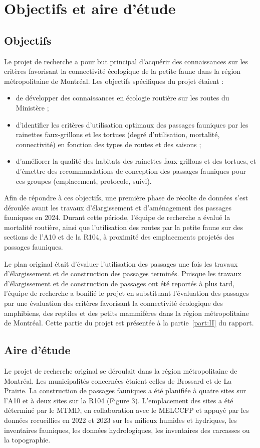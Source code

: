 
\section{Objectifs et aire d'étude}

\subsection{Objectifs}

Le projet de recherche a pour but principal d'acquérir des connaissances sur les critères favorisant la connectivité écologique de la petite faune dans la région métropolitaine de Montréal. Les objectifs spécifiques du projet étaient :

\begin{itemize}
    \item de développer des connaissances en écologie routière sur les routes du Ministère ;
    \item d'identifier les critères d'utilisation optimaux des passages fauniques par les rainettes faux-grillons et les tortues (degré d'utilisation, mortalité, connectivité) en fonction des types de routes et des saisons ;
    \item d'améliorer la qualité des habitats des rainettes faux-grillons et des tortues, et d'émettre des recommandations de conception des passages fauniques pour ces groupes (emplacement, protocole, suivi).
\end{itemize}

Afin de répondre à ces objectifs, une première phase de récolte de données s'est déroulée avant les travaux d'élargissement et d'aménagement des passages fauniques en 2024. Durant cette période, l'équipe de recherche a évalué la mortalité routière, ainsi que l'utilisation des routes par la petite faune sur des sections de l'A10 et de la R104, à proximité des emplacements projetés des passages fauniques.

Le plan original était d’évaluer l’utilisation des passages une fois les travaux d’élargissement et de construction des passages terminés. Puisque les travaux d’élargissement et de construction de passages ont été reportés à plus tard, l’équipe de recherche a bonifié le projet en substituant l’évaluation des passages par une évaluation des critères favorisant la connectivité écologique des amphibiens, des reptiles et des petits mammifères dans la région métropolitaine de Montréal. Cette partie du projet est présentée à la partie~\ref{part:II} du rapport.

\subsection{Aire d'étude}

Le projet de recherche original se déroulait dans la région métropolitaine de Montréal. Les municipalités concernées étaient celles de Brossard et de La Prairie. La construction de passages fauniques a été planifiée à quatre sites sur l'A10 et à deux sites sur la R104 (Figure 3). L’emplacement des sites a été déterminé par le MTMD, en collaboration avec le MELCCFP et appuyé par les données recueillies en 2022 et 2023 sur les milieux humides et hydriques, les inventaires fauniques, les données hydrologiques, les inventaires des carcasses ou la topographie.